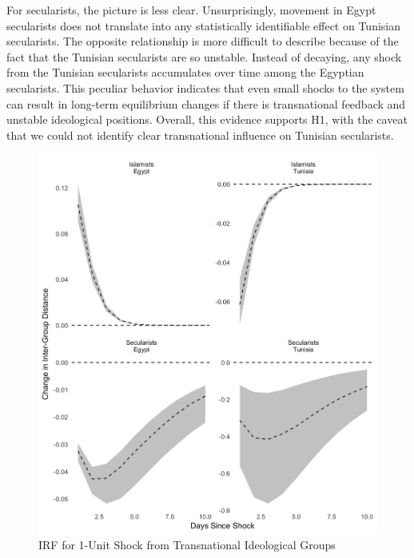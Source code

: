 \documentclass[12pt]{article}
\begin{document}
For secularists, the picture is less clear. Unsurprisingly, movement in Egypt secularists does not translate into any statistically identifiable effect on Tunisian secularists. The opposite relationship is more difficult to describe because of the fact that the Tunisian secularists are so unstable. Instead of decaying, any shock from the Tunisian secularists accumulates over time among the Egyptian secularists. This peculiar behavior indicates that even small shocks to the system can result in long-term equilibrium changes if there is transnational feedback and unstable ideological positions. Overall, this evidence supports H1, with the caveat that we could not identify clear transnational influence on Tunisian secularists.
 \begin{figure}[!h]
	\centering
	\caption{IRF for 1-Unit Shock from Transnational Ideological Groups}\label{cross_irf}
	\centering
	\includegraphics[width=.9\linewidth]{irf_egypt_panels}
\end{figure}
\end{document}
